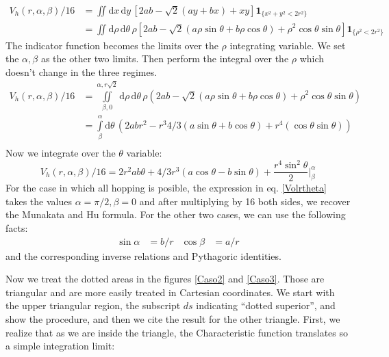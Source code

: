 \documentclass[superscriptaddress,pre,reprint,showpacs,onecolumn]{revtex4-1}
\newcommand{\rd}[1]{\mathrm{d}{#1} \,}
\newcommand{\indicator}[1]{\mathbf{1}_{ \{   #1 \} } }
\begin{document}
\begin{equation}\label{Vhatch1}
\begin{split}
V_h(r,\alpha,\beta)/16 &=
\iint \rd x \rd y \left[ 2ab-\sqrt{2}(ay+bx)+x y \right]
\indicator{x^2 + y^2 < 2r^2}\\
&=
\iint \rd \rho \rd \theta \rho 
\left[ 2ab -\sqrt{2}(a\rho\sin\theta+b\rho\cos\theta) +\rho^2 \cos\theta\sin\theta \right]
\indicator{\rho^2<2r^2 }
\end{split}
\end{equation}
The indicator function becomes the limits over the $\rho$ integrating variable.
We set the $\alpha, \beta$ as the other two limits. Then perform the
integral over the $\rho$ which doesn't change in the three regimes.
\begin{equation}
  \begin{split}
 V_h(r,\alpha,\beta)/16 &=\iint\limits_{\beta,0}^{\alpha,r\sqrt{2}} \rd \rho \rd \theta \rho (2ab
-\sqrt{2}(a\rho\sin\theta+b\rho\cos\theta)
+\rho^2 \cos\theta\sin\theta)\\
 &=\int\limits_\beta^{\alpha}  \rd \theta  
(2abr^2 - r^3 4/3 (a\sin\theta+b\cos\theta)+r^4 (\cos\theta\sin\theta))\\
\end{split}
  \end{equation}
Now we integrate over the $\theta$ variable:
\begin{equation}\label{Volrtheta}
  V_h(r,\alpha,\beta)/16 = 2r^2ab\theta
  +4/3r^3(a\cos\theta-b\sin\theta)
  +\frac{r^4 \sin^2\theta}{2} \Bigg\vert_\beta^\alpha
\end{equation}
For the case in which all hopping is posible, the expression in eq. \ref{Volrtheta}
takes the values $\alpha=\pi/2, \beta=0$ and after multiplying by 16 both sides,
we recover the Munakata and Hu formula. For the other two cases, we can use the following
facts:
\begin{align}
  \sin\alpha&=b/r & \cos\beta&=a/r 
\end{align}
and the corresponding inverse relations and Pythagoric identities.


Now we treat the dotted areas in the figures \ref{Caso2} and \ref{Caso3}. Those are triangular
and are more easily treated in Cartesian coordinates. We start with the upper
triangular region, the subscript $ds$ indicating ``dotted superior'',
and show the procedure, and then we cite the result for the
other triangle.
First, we realize that as we are inside the triangle, the Characteristic function
translates so a simple integration limit:
\end{document}
